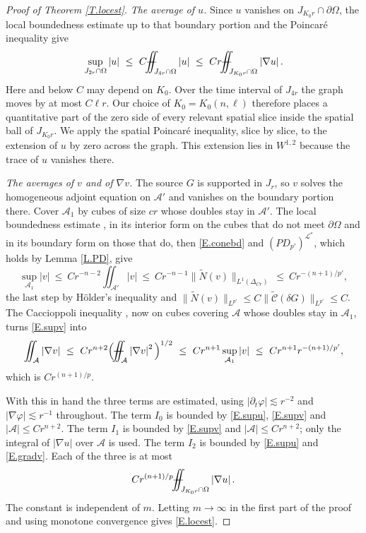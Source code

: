 \documentclass[10pt,a4paper]{amsart}
\numberwithin{equation}{section}
\newcommand{\wt}{\widetilde}
\newcommand{\abs}[1]{\left\vert#1\right\vert}
\newcommand{\om}{\Omega}
\newcommand{\pom}{\partial\Omega}
\newcommand{\pd}{\partial}
\newcommand{\LL}{\mathcal L}
\newcommand{\Nt}{\widetilde N}
\def\Yint#1{\mathchoice
	{\YYint\displaystyle\textstyle{#1}}%
	{\YYint\textstyle\scriptstyle{#1}}%
	{\YYint\scriptstyle\scriptscriptstyle{#1}}%
	{\YYint\scriptscriptstyle\scriptscriptstyle{#1}}%
	\!\dint}
\newcommand{\dint}{\int\!\!\!\!\!\int}
\def\YYint#1#2#3{{\setbox0=\hbox{$#1{#2#3}{\iint}$}
		\vcenter{\hbox{$#2#3$}}\kern-.51\wd0}}
\def\longdash{\mkern-1.5mu{-}\mkern-7.5mu{-}}
\def\fiint{\Yint\longdash}
\begin{document}
\begin{proof}[Proof of Theorem \ref{T.locest}]
\noindent\emph{The average of $u$.} Since $u$ vanishes on
$J_{K_0r}\cap\pom$, the
local boundedness estimate up to that boundary portion \cite[Ch.~III]{LSU} and
the Poincar\'e inequality give
\begin{equation}\label{E.supu}
  \sup_{J_{2r}\cap\om}\abs u\ \le\ C\fiint_{J_{4r}\cap\om}\abs u
  \ \le\ Cr\fiint_{J_{K_0r}\cap\om}\abs{\nabla u} .
\end{equation}
Here and below $C$ may depend on $K_0$. Over the time interval of $J_{4r}$ the
graph moves by at most $C\ell r$. Our choice of $K_0=K_0(n,\ell)$ therefore
places a quantitative part of the zero side of every relevant spatial slice
inside the spatial ball of $J_{K_0r}$. We apply the spatial Poincar\'e
inequality, slice by slice, to the extension of $u$ by zero across the graph.
This extension lies in $W^{1,2}$ because the trace of $u$ vanishes there.

\noindent\emph{The averages of $v$ and of $\nabla v$.} The source $G$ is
supported in $J_r$, so $v$ solves the
homogeneous adjoint equation on $\mathcal A'$ and vanishes on the boundary
portion there. Cover $\mathcal A_1$ by cubes of size $cr$ whose doubles stay
in $\mathcal A'$. The local boundedness estimate \cite[Ch.~III]{LSU}, in its
interior form on the cubes that do not meet $\pom$ and in its boundary form on
those that do, then \eqref{E.conebd} and $(PD_{p'})^{\LL^*}$, which holds by
Lemma \ref{L.PD}, give
\begin{equation}\label{E.supv}
  \sup_{\mathcal A_1}\abs v\ \le\ Cr^{-n-2}\iint_{\mathcal A'}\abs v
  \ \le\ Cr^{-n-1}\big\|\Nt(v)\big\|_{L^1(\Delta_{Cr})}
  \ \le\ Cr^{-(n+1)/p'} ,
\end{equation}
the last step by H\"older's inequality and
$\|\Nt(v)\|_{L^{p'}}\le C\|\wt{\mathcal C}(\delta G)\|_{L^{p'}}\le C$. The
Caccioppoli inequality \cite{Ar}, now on cubes covering $\mathcal A$ whose
doubles stay in $\mathcal A_1$, turns \eqref{E.supv} into
\begin{equation}\label{E.gradv}
  \iint_{\mathcal A}\abs{\nabla v}\ \le\ Cr^{n+2}
  \Big(\fiint_{\mathcal A}\abs{\nabla v}^2\Big)^{1/2}
  \ \le\ Cr^{n+1}\sup_{\mathcal A_1}\abs v
  \ \le\ Cr^{n+1}r^{-(n+1)/p'} ,
\end{equation}
which is $Cr^{(n+1)/p}$.\medskip

\noindent With this in hand the three terms are estimated, using
$\abs{\pd_t\varphi}\lesssim r^{-2}$ and $\abs{\nabla\varphi}\lesssim r^{-1}$
throughout. The term $I_0$ is bounded by \eqref{E.supu}, \eqref{E.supv} and
$\abs{\mathcal A}\le Cr^{n+2}$. The term $I_1$ is bounded by \eqref{E.supv} and
$\abs{\mathcal A}\le Cr^{n+2}$; only the integral of $|\nabla u|$ over
$\mathcal A$ is used. The term $I_2$ is bounded by
\eqref{E.supu} and \eqref{E.gradv}. Each of the three is at most
$$Cr^{(n+1)/p}\fiint_{J_{K_0r}\cap\om}\abs{\nabla u}.$$
The constant is independent of $m$. Letting $m\to\infty$ in the first part of
the proof and using monotone convergence gives \eqref{E.locest}.
\end{proof}
\end{document}
